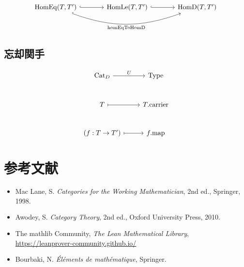 \documentclass[a4paper,11pt]{ltjsarticle}
\theoremstyle{definition}
\begin{document}
\[
\begin{tikzcd}[column sep=large]
\mathrm{HomEq}(T, T') \arrow[r, hookrightarrow] \arrow[rr, bend right=20, hookrightarrow, "{\mathrm{homEqToHomD}}"']
  & \mathrm{HomLe}(T, T') \arrow[r, hookrightarrow]
  & \mathrm{HomD}(T, T')
\end{tikzcd}
\]

\subsection*{忘却関手}

\[
\begin{tikzcd}[row sep=large]
\mathrm{Cat}_D \arrow[r, "U"] & \mathrm{Type} \\
T \arrow[r, mapsto] & T.\mathrm{carrier} \\
(f : T \to T') \arrow[r, mapsto] & f.\mathrm{map}
\end{tikzcd}
\]

\section*{参考文献}

\begin{itemize}
  \item Mac Lane, S. \textit{Categories for the Working Mathematician}, 2nd ed., Springer, 1998.
  \item Awodey, S. \textit{Category Theory}, 2nd ed., Oxford University Press, 2010.
  \item The mathlib Community, \textit{The Lean Mathematical Library}, \url{https://leanprover-community.github.io/}
  \item Bourbaki, N. \textit{Éléments de mathématique}, Springer.
\end{itemize}
\end{document}
